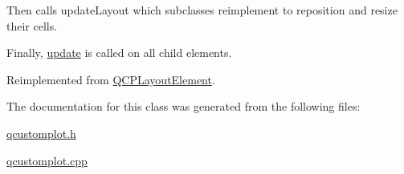 Then calls update\+Layout which subclasses reimplement to reposition and resize their cells.

Finally, \hyperlink{classQCPLayout_a34ab477e820537ded7bade4399c482fd}{update} is called on all child elements. 

Reimplemented from \hyperlink{classQCPLayoutElement_a929c2ec62e0e0e1d8418eaa802e2af9b}{Q\+C\+P\+Layout\+Element}.



The documentation for this class was generated from the following files\+:\begin{DoxyCompactItemize}
\item 
\hyperlink{qcustomplot_8h}{qcustomplot.\+h}\item 
\hyperlink{qcustomplot_8cpp}{qcustomplot.\+cpp}\end{DoxyCompactItemize}
